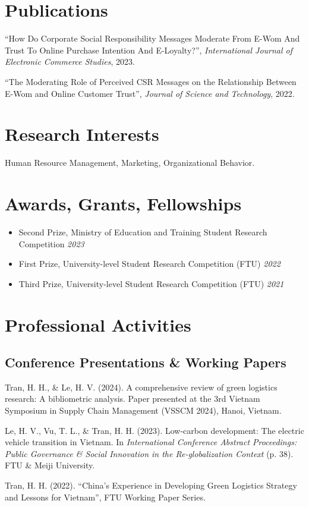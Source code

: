 \documentclass[12pt]{article}
\begin{document}
\section{Publications}
\begin{enumerate}[label={[\arabic*]}]
  \item ``How Do Corporate Social Responsibility Messages Moderate From E-Wom And Trust To Online Purchase Intention And E-Loyalty?'', \textit{International Journal of Electronic Commerce Studies}, 2023.
  \item ``The Moderating Role of Perceived CSR Messages on the Relationship Between E-Wom and Online Customer Trust'', \textit{Journal of Science and Technology}, 2022.
\end{enumerate}

\section{Research Interests}
Human Resource Management, Marketing, Organizational Behavior.

\section{Awards, Grants, Fellowships}
\begin{itemize}[leftmargin=*]
  \item Second Prize, Ministry of Education and Training Student Research Competition \hfill \emph{2023}
  \item First Prize, University-level Student Research Competition (FTU) \hfill \emph{2022}
  \item Third Prize, University-level Student Research Competition (FTU) \hfill \emph{2021}
\end{itemize}

\section{Professional Activities}
\subsection{Conference Presentations \& Working Papers}
\begin{enumerate}[label={[\arabic*]}]
  \item Tran, H. H., \& Le, H. V. (2024). A comprehensive review of green logistics research: A bibliometric analysis. Paper presented at the 3rd Vietnam Symposium in Supply Chain Management (VSSCM 2024), Hanoi, Vietnam.
  \item Le, H. V., Vu, T. L., \& Tran, H. H. (2023). Low-carbon development: The electric vehicle transition in Vietnam. In \textit{International Conference Abstract Proceedings: Public Governance \& Social Innovation in the Re-globalization Context} (p. 38). FTU \& Meiji University.
  \item Tran, H. H. (2022). ``China’s Experience in Developing Green Logistics Strategy and Lessons for Vietnam'', FTU Working Paper Series.
\end{enumerate}
\end{document}
